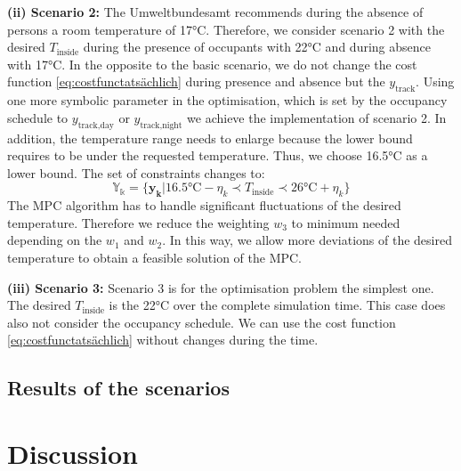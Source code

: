 \textbf{(ii) Scenario 2:}\newline
The Umweltbundesamt \cite{Umweltbundesamt.7.10.2021} recommends during the absence of persons a room temperature of 17°C. Therefore, we consider scenario 2 with the desired $T_\text{inside}$ during the presence of occupants with 22°C and during absence with 17°C. In the opposite to the basic scenario, we do not change the cost function \ref{eq:costfunctatsächlich} during presence and absence but the $y_\text{track}$. Using one more symbolic parameter in the optimisation, which is set by the occupancy schedule to $y_\text{track,day}$ or $y_\text{track,night}$ we achieve the implementation of scenario 2. In addition, the temperature range needs to enlarge because the lower bound requires to be under the requested temperature. Thus, we choose 16.5°C as a lower bound. The set of constraints changes to:
\begin{equation}
    \label{ConstraintYScenario2}
    \mathbb{Y_k} = \{\mathbf{y_k}| 16.5 \text{°C} - \eta_k \prec T_\text{inside} \prec 26 \text{°C}+ \eta_k\} 
\end{equation}
The MPC algorithm has to handle significant fluctuations of the desired temperature. Therefore we reduce the weighting $w_\text{3}$ to minimum needed depending on the $w_\text{1}$ and $w_\text{2}$. In this way, we allow more deviations of the desired temperature to obtain a feasible solution of the MPC. \newline 

\textbf{(iii) Scenario 3:}\newline
Scenario 3 is for the optimisation problem the simplest one. The desired $T_\text{inside}$ is the 22°C over the complete simulation time. This case does also not consider the occupancy schedule. We can use the cost function \ref{eq:costfunctatsächlich} without changes during the time.

\subsection{Results of the scenarios}
\label{subsec:Results of the scenarios}
\section{Discussion}
\label{sec:discussion}

